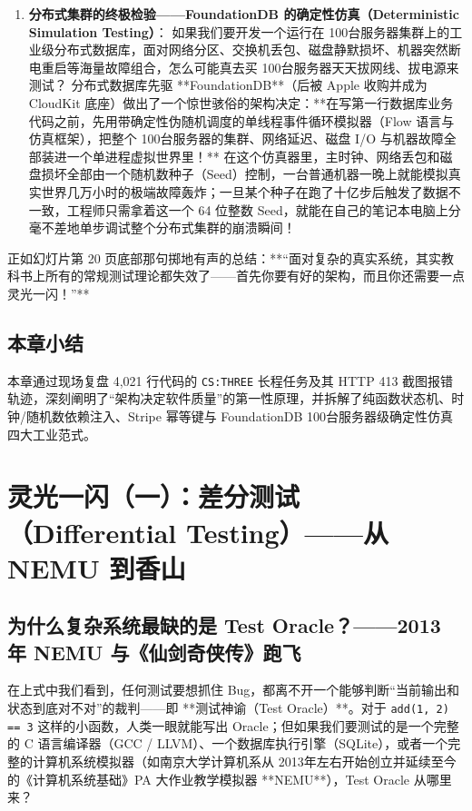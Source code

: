 \documentclass[a4paper]{article}
\begin{document}
\begin{enumerate}
    \item \textbf{分布式集群的终极检验——FoundationDB 的确定性仿真（Deterministic Simulation Testing）}：
    如果我们要开发一个运行在 100台服务器集群上的工业级分布式数据库，面对网络分区、交换机丢包、磁盘静默损坏、机器突然断电重启等海量故障组合，怎么可能真去买 100台服务器天天拔网线、拔电源来测试？
    分布式数据库先驱 **FoundationDB**（后被 Apple 收购并成为 CloudKit 底座）做出了一个惊世骇俗的架构决定：**在写第一行数据库业务代码之前，先用带确定性伪随机调度的单线程事件循环模拟器（Flow 语言与仿真框架），把整个 100台服务器的集群、网络延迟、磁盘 I/O 与机器故障全部装进一个单进程虚拟世界里！** 在这个仿真器里，主时钟、网络丢包和磁盘损坏全部由一个随机数种子（Seed）控制，一台普通机器一晚上就能模拟真实世界几万小时的极端故障轰炸；一旦某个种子在跑了十亿步后触发了数据不一致，工程师只需拿着这一个 64 位整数 Seed，就能在自己的笔记本电脑上分毫不差地单步调试整个分布式集群的崩溃瞬间！
\end{enumerate}

正如幻灯片第 20 页底部那句掷地有声的总结：**“面对复杂的真实系统，其实教科书上所有的常规测试理论都失效了——首先你要有好的架构，而且你还需要一点灵光一闪！”**

\subsection{本章小结}

本章通过现场复盘 4,021 行代码的 \texttt{CS:THREE} 长程任务及其 HTTP 413 截图报错轨迹，深刻阐明了“架构决定软件质量”的第一性原理，并拆解了纯函数状态机、时钟/随机数依赖注入、Stripe 幂等键与 FoundationDB 100台服务器级确定性仿真四大工业范式。

\section{灵光一闪（一）：差分测试（Differential Testing）——从 NEMU 到香山}

\subsection{为什么复杂系统最缺的是 Test Oracle？——2013 年 NEMU 与《仙剑奇侠传》跑飞}

在上式中我们看到，任何测试要想抓住 Bug，都离不开一个能够判断“当前输出和状态到底对不对”的裁判——即 **测试神谕（Test Oracle）**。对于 \texttt{add(1, 2) == 3} 这样的小函数，人类一眼就能写出 Oracle；但如果我们要测试的是一个完整的 C 语言编译器（GCC / LLVM）、一个数据库执行引擎（SQLite），或者一个完整的计算机系统模拟器（如南京大学计算机系从 2013年左右开始创立并延续至今的《计算机系统基础》PA 大作业教学模拟器 **NEMU**），Test Oracle 从哪里来？
\end{document}

